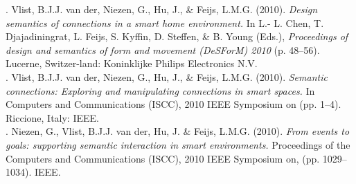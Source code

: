 . Vlist, B.J.J. van der, Niezen, G., Hu, J., \& Feijs, L.M.G. (2010). \emph{Design semantics of connections in a smart home environment.} In L.- L. Chen, T. Djajadiningrat, L. Feijs, S. Kyffin, D. Steffen, \&  B. Young (Eds.), \emph{Proceedings of design and semantics of form and movement (DeSForM) 2010} (p. 48--56). Lucerne, Switzer-land: Koninklijke Philips Electronics N.V.\\

. Vlist, B.J.J. van der, Niezen, G., Hu, J., \& Feijs, L.M.G. (2010). \emph{Semantic connections: Exploring and manipulating connections in smart spaces.} In Computers and Communications (ISCC), 2010 IEEE Symposium on (pp. 1--4). Riccione, Italy: IEEE.\\

. Niezen, G., Vlist, B.J.J. van der, Hu, J. \& Feijs, L.M.G. (2010). \emph{From events to goals: supporting semantic interaction in smart environments.} Proceedings of the Computers and Communications (ISCC), 2010 IEEE Symposium on, (pp. 1029--1034). IEEE.\\


